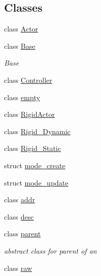 \subsection*{\-Classes}
\begin{DoxyCompactItemize}
\item 
class \hyperlink{classNeb_1_1Actor_1_1Actor}{\-Actor}
\item 
class \hyperlink{classNeb_1_1Actor_1_1Base}{\-Base}
\begin{DoxyCompactList}\small\item\em \-Base \end{DoxyCompactList}\item 
class \hyperlink{classNeb_1_1Actor_1_1Controller}{\-Controller}
\item 
class \hyperlink{classNeb_1_1Actor_1_1empty}{empty}
\item 
class \hyperlink{classNeb_1_1Actor_1_1RigidActor}{\-Rigid\-Actor}
\item 
class \hyperlink{classNeb_1_1Actor_1_1Rigid__Dynamic}{\-Rigid\-\_\-\-Dynamic}
\item 
class \hyperlink{classNeb_1_1Actor_1_1Rigid__Static}{\-Rigid\-\_\-\-Static}
\item 
struct \hyperlink{structNeb_1_1Actor_1_1mode__create}{mode\-\_\-create}
\item 
struct \hyperlink{structNeb_1_1Actor_1_1mode__update}{mode\-\_\-update}
\item 
class \hyperlink{classNeb_1_1Actor_1_1addr}{addr}
\item 
class \hyperlink{classNeb_1_1Actor_1_1desc}{desc}
\item 
class \hyperlink{classNeb_1_1Actor_1_1parent}{parent}
\begin{DoxyCompactList}\small\item\em abstract class for parent of an  \end{DoxyCompactList}\item 
class \hyperlink{classNeb_1_1Actor_1_1raw}{raw}
\end{DoxyCompactItemize}
